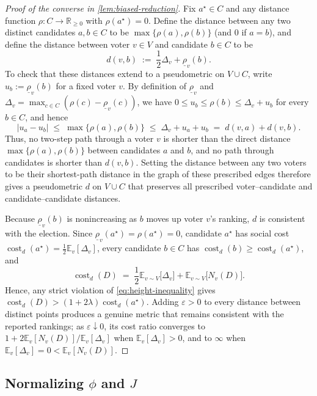 \documentclass[11pt]{article}
\numberwithin{equation}{section}
\theoremstyle{plain}
\theoremstyle{definition}
\newcommand{\E}{\mathbb{E}}
\newcommand{\R}{\mathbb{R}}
\newcommand{\1}{\mathbf{1}}
\newcommand{\lowrho}{\underline{\rho}}
\newcommand{\cost}{\operatorname{cost}}
\begin{document}
\begin{proof}[Proof of the converse in {\cref{lem:biased-reduction}}]
Fix $a^\star \in C$ and any distance function $\rho \colon C \to \R_{\ge 0}$ with $\rho(a^\star) = 0$. Define the distance between any two distinct candidates $a, b \in C$ to be $\max\{\rho(a), \rho(b)\}$ (and $0$ if $a = b$), and define the distance between voter $v \in V$ and candidate $b \in C$ to be
\[
  d(v, b) \;:=\; \frac{1}{2}\Delta_v + \lowrho_v(b).
\]
To check that these distances extend to a pseudometric on $V \cup C$, write $u_b := \lowrho_v(b)$ for a fixed voter $v$. By definition of $\lowrho_v$ and $\Delta_v = \max_{c \in C}(\rho(c) - \lowrho_v(c))$, we have $0 \le u_b \le \rho(b) \le \Delta_v + u_b$ for every $b \in C$, and hence
\[
  |u_a - u_b| \;\le\; \max\{\rho(a), \rho(b)\} \;\le\; \Delta_v + u_a + u_b
  \;=\; d(v, a) + d(v, b).
\]
Thus, no two-step path through a voter $v$ is shorter than the direct distance $\max\{\rho(a), \rho(b)\}$ between candidates $a$ and $b$, and no path through candidates is shorter than $d(v, b)$. Setting the distance between any two voters to be their shortest-path distance in the graph of these prescribed edges therefore gives a pseudometric $d$ on $V \cup C$ that preserves all prescribed voter--candidate and candidate--candidate distances.

Because $\lowrho_v(b)$ is nonincreasing as $b$ moves up voter $v$'s ranking, $d$ is consistent with the election. Since $\lowrho_v(a^\star) = \rho(a^\star) = 0$, candidate $a^\star$ has social cost $\cost_d(a^\star) = \frac{1}{2}\E_v[\Delta_v]$, every candidate $b \in C$ has $\cost_d(b) \ge \cost_d(a^\star)$, and
\[
  \cost_d(D) \;=\; \frac{1}{2}\E_{v \sim V}\bigl[\Delta_v\bigr] + \E_{v \sim V}\bigl[N_v(D)\bigr].
\]
Hence, any strict violation of \cref{eq:height-inequality} gives $\cost_d(D) > (1 + 2\lambda)\cost_d(a^\star)$. Adding $\varepsilon > 0$ to every distance between distinct points produces a genuine metric that remains consistent with the reported rankings; as $\varepsilon \downarrow 0$, its cost ratio converges to $1 + 2\E_v[N_v(D)] / \E_v[\Delta_v]$ when $\E_v[\Delta_v] > 0$, and to $\infty$ when $\E_v[\Delta_v] = 0 < \E_v[N_v(D)]$.
\end{proof}

\subsection{Normalizing \texorpdfstring{$\phi$}{phi} and \texorpdfstring{$J$}{J}}
\label{app:normalization}
\end{document}

